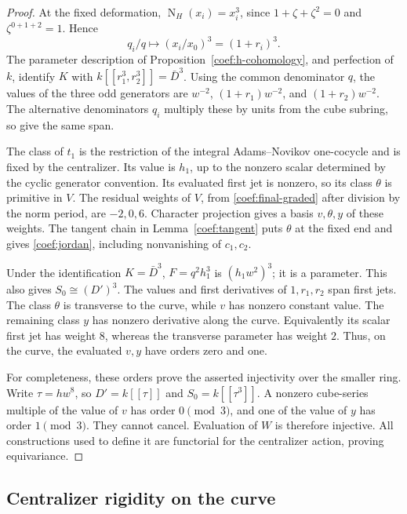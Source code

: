 \documentclass[11pt]{article}
\theoremstyle{definition}
\theoremstyle{remark}
\numberwithin{equation}{section}
\begin{document}
\begin{proof}
At the fixed deformation,
\(\operatorname{N}_H(x_i)=x_i^3\), since \(1+\zeta+\zeta^2=0\) and
\(\zeta^{0+1+2}=1\).  Hence
\[
 q_i/q\longmapsto (x_i/x_0)^3=(1+r_i)^3.
\]
The parameter description of
Proposition~\ref{coef:h-cohomology}, and perfection of \(k\), identify
\(K\) with \(k[[r_1^3,r_2^3]]=\bar D^3\).
Using the common denominator \(q\), the values of the three odd
generators are \(w^{-2}\), \((1+r_1)w^{-2}\), and
\((1+r_2)w^{-2}\).  The alternative denominators \(q_i\) multiply
these by units from the cube subring, so give the same span.

The class of \(t_1\) is the restriction of the integral
Adams--Novikov one-cocycle and is fixed by the centralizer.
Its value is \(h_1\), up to the nonzero scalar determined by the
cyclic generator convention.  Its evaluated first jet is nonzero,
so its class \(\theta\) is primitive in \(V\).
The residual weights of \(V\), from
\eqref{coef:final-graded} after division by the norm period, are
\(-2,0,6\).  Character projection gives a basis \(v,\theta,y\)
of these weights.  The tangent chain in
Lemma~\ref{coef:tangent} puts \(\theta\) at the fixed end and gives
\eqref{coef:jordan}, including nonvanishing of \(c_1,c_2\).

Under the identification \(K=\bar D^3\),
\(F=q^2h_1^3\) is \((h_1w^2)^3\); it is a parameter.
This also gives \(S_0\cong(D')^3\).
The values and first derivatives of \(1,r_1,r_2\) span first jets.
The class \(\theta\) is transverse to the curve, while \(v\) has
nonzero constant value.  The remaining class \(y\) has nonzero
derivative along the curve.  Equivalently its scalar first jet has
weight \(8\), whereas the transverse parameter has weight \(2\).
Thus, on the curve, the evaluated \(v,y\) have orders zero and one.

For completeness, these orders prove the asserted injectivity over
the smaller ring.  Write \(\tau=hw^8\), so
\(D'=k[[\tau]]\) and \(S_0=k[[\tau^3]]\).
A nonzero cube-series multiple of the value of \(v\) has order
\(0\pmod3\), and one of the value of \(y\) has order \(1\pmod3\).
They cannot cancel.  Evaluation of \(W\) is therefore injective.
All constructions used to define it are functorial for the
centralizer action, proving equivariance.
\end{proof}

\subsection{Centralizer rigidity on the curve}
\end{document}
